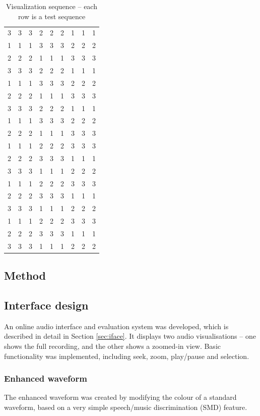 \begin{table}
{\begin{tabular}{rrrrrrrrr}
      3 & 3 & 3 & 2 & 2 & 2 & 1 & 1 & 1 \\ 
      1 & 1 & 1 & 3 & 3 & 3 & 2 & 2 & 2 \\ 
      2 & 2 & 2 & 1 & 1 & 1 & 3 & 3 & 3 \\ 
      3 & 3 & 3 & 2 & 2 & 2 & 1 & 1 & 1 \\ 
      1 & 1 & 1 & 3 & 3 & 3 & 2 & 2 & 2 \\ 
      2 & 2 & 2 & 1 & 1 & 1 & 3 & 3 & 3 \\ 
      3 & 3 & 3 & 2 & 2 & 2 & 1 & 1 & 1 \\ 
      1 & 1 & 1 & 3 & 3 & 3 & 2 & 2 & 2 \\ 
      2 & 2 & 2 & 1 & 1 & 1 & 3 & 3 & 3 \\ 
      1 & 1 & 1 & 2 & 2 & 2 & 3 & 3 & 3 \\ 
      2 & 2 & 2 & 3 & 3 & 3 & 1 & 1 & 1 \\ 
      3 & 3 & 3 & 1 & 1 & 1 & 2 & 2 & 2 \\ 
      1 & 1 & 1 & 2 & 2 & 2 & 3 & 3 & 3 \\ 
      2 & 2 & 2 & 3 & 3 & 3 & 1 & 1 & 1 \\ 
      3 & 3 & 3 & 1 & 1 & 1 & 2 & 2 & 2 \\ 
      1 & 1 & 1 & 2 & 2 & 2 & 3 & 3 & 3 \\ 
      2 & 2 & 2 & 3 & 3 & 3 & 1 & 1 & 1 \\ 
      3 & 3 & 3 & 1 & 1 & 1 & 2 & 2 & 2 \\ 
    \end{tabular}
    \caption{Visualization sequence -- each row is a test sequence}
    \label{tab:visseq}
  }
\end{table}

\subsection{Method}

\subsection{Interface design}
An online audio interface and evaluation system was developed, which is
described in detail in Section \ref{sec:iface}. It displays two audio
visualisations -- one shows the full recording, and the other shows a zoomed-in
view. Basic functionality was implemented, including seek, zoom, play/pause and
selection.

\subsubsection{Enhanced waveform}\label{sec:studywaveform}
The enhanced waveform was created by modifying the colour of a standard
waveform, based on a very simple speech/music discrimination (SMD) feature.

